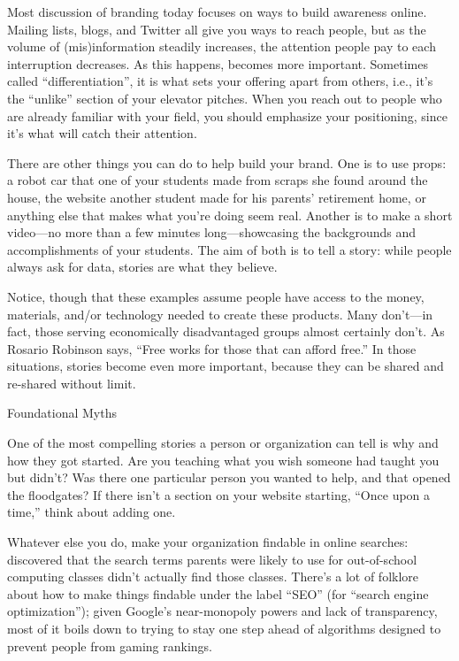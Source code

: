 Most discussion of branding today focuses on ways to build awareness
online. Mailing lists, blogs, and Twitter all give you ways to reach
people, but as the volume of (mis)information steadily increases, the
attention people pay to each interruption decreases. As this happens,
 becomes more important.
Sometimes called ``differentiation'', it is what sets your offering
apart from others, i.e., it's the ``unlike'' section of your elevator
pitches.  When you reach out to people who are already familiar with
your field, you should emphasize your positioning, since it's what
will catch their attention.

There are other things you can do to help build your brand.  One is to
use props: a robot car that one of your students made from scraps she
found around the house, the website another student made for his
parents' retirement home, or anything else that makes what you're
doing seem real. Another is to make a short video---no more than a few
minutes long---showcasing the backgrounds and accomplishments of your
students.  The aim of both is to tell a story: while people always ask
for data, stories are what they believe.

Notice, though that these examples assume people have access to the
money, materials, and/or technology needed to create these products.
Many don't---in fact, those serving economically disadvantaged groups
almost certainly don't.  As Rosario Robinson says, ``Free works for
those that can afford free.''  In those situations, stories become
even more important, because they can be shared and re-shared without
limit.

\begin{callout}{Foundational Myths}

  One of the most compelling stories a person or organization can tell
  is why and how they got started. Are you teaching what you wish
  someone had taught you but didn't? Was there one particular person
  you wanted to help, and that opened the floodgates?  If there isn't
  a section on your website starting, ``Once upon a time,'' think
  about adding one.

\end{callout}

Whatever else you do, make your organization findable in online
searches: \cite{DiSa2014b} discovered that the search terms parents
were likely to use for out-of-school computing classes didn't actually
find those classes.  There's a lot of folklore about how to make
things findable under the label ``SEO'' (for ``search engine
optimization''); given Google's near-monopoly powers and lack of
transparency, most of it boils down to trying to stay one step ahead
of algorithms designed to prevent people from gaming rankings.

